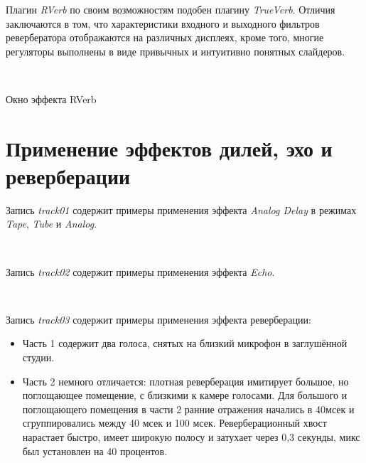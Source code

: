\documentclass{beamer}
\begin{document}
\begin{frame}
  Плагин \emph{RVerb} по своим возможностям подобен плагину \emph{TrueVerb}. Отличия заключаются в том, что характеристики входного и выходного фильтров ревербератора отображаются на различных дисплеях, кроме того, многие регуляторы выполнены в виде привычных и интуитивно понятных слайдеров.

  ~

  \begin{block}{Окно эффекта RVerb}
  \end{block}
\end{frame}

\section{Применение эффектов дилей, эхо и реверберации}
\begin{frame}
  Запись \emph{track01} содержит примеры применения эффекта \emph{Analog Delay} в режимах \emph{Tape}, \emph{Tube} и \emph{Analog}.

  ~

  Запись \emph{track02} содержит примеры применения эффекта \emph{Echo}.

  ~

  Запись \emph{track03} содержит примеры применения эффекта реверберации:
  \begin{itemize}
    \item Часть 1 содержит два голоса, снятых на близкий микрофон в заглушённой студии.
    \item Часть 2 немного отличается: плотная реверберация имитирует большое, но поглощающее помещение, с близкими к камере голосами. Для большого и поглощающего помещения в части 2 ранние отражения начались в 40мсек и сгруппировались между 40 мсек и 100 мсек. Реверберационный хвост нарастает быстро, имеет широкую полосу и затухает через 0,3 секунды, микс был установлен на 40 процентов.
  \end{itemize}
\end{frame}  
          
\end{document}

